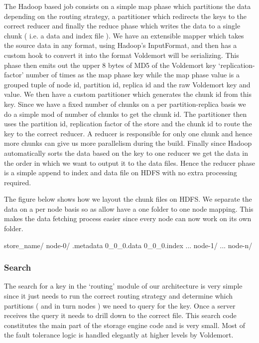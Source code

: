 \documentclass[10pt,twocolumn,preprint,natbib,authoryear]{sigplanconf}
\begin{document}
The Hadoop based job consists on a simple map phase which partitions the data depending on the routing strategy, a partitioner which redirects the keys to the correct reducer and finally the reduce phase which writes the data to a single chunk ( i.e. a data and index file ). We have an extensible mapper which takes the source data in any format, using Hadoop's InputFormat, and then has a custom hook to convert it into the format Voldemort will be serializing. This phase then emits out the upper 8 bytes of MD5 of the Voldemort key `replication-factor' number of times as the map phase key while the map phase value is a grouped tuple of node id, partition id, replica id and the raw Voldemort key and value. We then have a custom partitioner which generates the chunk id from this key. Since we have a fixed number of chunks on a per partition-replica basis we do a simple mod of number of chunks to get the chunk id. The partitioner then uses the partition id, replication factor of the store and the chunk id to route the key to the correct reducer. A reducer is responsible for only one chunk and hence more chunks can give us more parallelism during the build. Finally since Hadoop automatically sorts the data based on the key to one reducer we get the data in the order in which we want to output it to the data files. Hence the reducer phase is a simple append to index and data file on HDFS with no extra processing required.  

The figure below shows how we layout the chunk files on HDFS. We separate the data on a per node basis so as allow have a one folder to one node mapping. This makes the data fetching process easier since every node can now work on its own folder. 

\scriptsize
\begin{verbatimtab}
store_name/
  node-0/
    .metadata
    0_0_0.data
    0_0_0.index
    ...
  node-1/
  ...
  node-n/
\end{verbatimtab}
\normalsize


\subsubsection{Search}
\label{sec:read_only:search}

The search for a key in the `routing' module of our architecture is very simple since it just needs to run the correct routing strategy and determine which partitions ( and in turn nodes ) we need to query for the key. Once a server receives the query it needs to drill down to the correct file. This search code constitutes the main part of the storage engine code and is very small. Most of the fault tolerance logic is handled elegantly at higher levels by Voldemort.
\end{document}
